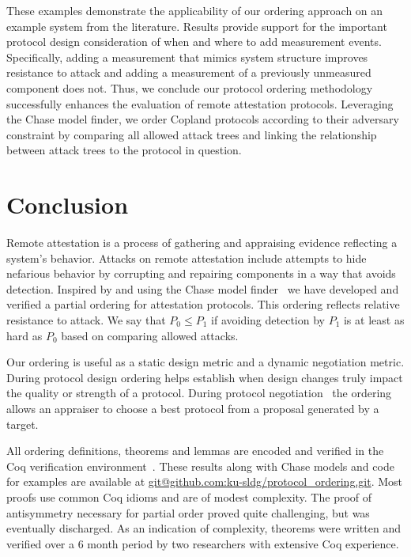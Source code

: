 \documentclass[runningheads]{llncs}
\theoremstyle{definition}
\begin{document}
These examples demonstrate the applicability of our ordering approach
on an example system from the literature.  Results provide support for
the important protocol design consideration of when and where to add
measurement events.  Specifically, adding a measurement that mimics
system structure improves resistance to attack and adding a
measurement of a previously unmeasured component does not.  Thus, we
conclude our protocol ordering methodology successfully enhances the
evaluation of remote attestation protocols.  Leveraging the Chase
model finder, we order Copland protocols according to their adversary
constraint by comparing all allowed attack trees and linking the
relationship between attack trees to the protocol in question.

\section{Conclusion}

Remote attestation is a process of gathering and appraising evidence
reflecting a system's behavior.  Attacks on remote attestation include
attempts to hide nefarious behavior by corrupting and repairing
components in a way that avoids detection.  Inspired by
\citet{Rowe:2021:OnOrdering} and using the Chase model
finder~\citep{Ramsdell:2020:Chase} we have developed and verified a
partial ordering for attestation protocols.  This ordering reflects
relative resistance to attack.  We say that $P_0\leq P_1$ if avoiding
detection by $P_1$ is at least as hard as $P_0$ based on comparing
allowed attacks.

Our ordering is useful as a static design metric and a dynamic
negotiation metric.  During protocol design ordering helps establish
when design changes truly impact the quality or strength of a
protocol.  During protocol negotiation~\citep{Fritz:2023:framework}
the ordering allows an appraiser to choose a best protocol from a
proposal generated by a target.

All ordering definitions, theorems and lemmas are encoded and verified
in the Coq verification environment~\citep{Bertot:2013aa}. These
results along with Chase models and code for examples are available at
\url{git@github.com:ku-sldg/protocol_ordering.git}.  Most proofs use
common Coq idioms and are of modest complexity.  The proof of
antisymmetry necessary for partial order proved quite challenging, but
was eventually discharged.  As an indication of complexity, theorems
were written and verified over a 6 month period by two researchers
with extensive Coq experience.
\end{document}
